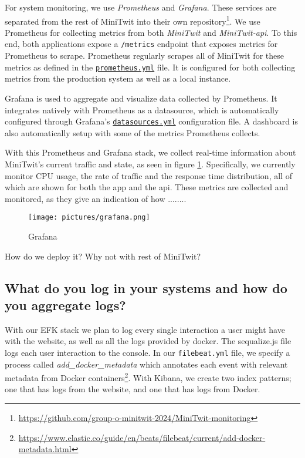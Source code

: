 \documentclass[11pt]{article}
\begin{document}
For system monitoring, we use \textit{Prometheus} and \textit{Grafana}. These services are separated from the rest of MiniTwit into their own repository\footnote{\url{https://github.com/group-o-minitwit-2024/MiniTwit-monitoring}}. We use Prometheus for collecting metrics from both \textit{MiniTwit} and \textit{MiniTwit-api}. To this end, both applications expose a \texttt{/metrics} endpoint that exposes metrics for Prometheus to scrape. Prometheus regularly scrapes all of MiniTwit for these metrics as defined in the \href{https://github.com/group-o-minitwit-2024/MiniTwit-monitoring/blob/main/prometheus/prometheus.yml}{\texttt{prometheus.yml}} file. It is configured for both collecting metrics from the production system as well as a local instance. 

Grafana is used to aggregate and visualize data collected by Prometheus. It integrates natively with Prometheus as a datasource, which is automatically configured through Grafana's \href{https://github.com/group-o-minitwit-2024/MiniTwit-monitoring/blob/main/grafana/provisioning/datasources/datasources.yaml}{\texttt{datasources.yml}} configuration file. A dashboard is also automatically setup with some of the metrics Prometheus collects. 

With this Prometheus and Grafana stack, we collect real-time information about MiniTwit's current traffic and state, as seen in figure \ref{fig:grafana}. Specifically, we currently monitor CPU usage, the rate of traffic and the response time distribution, all of which are shown for both the app and the api. These metrics are collected and monitored, as they give an indication of how ........

\begin{figure}[h]
    \centering
    \texttt{[image: pictures/grafana.png]}
    \caption{Grafana}
    \label{fig:grafana}
\end{figure}

How do we deploy it?
    Why not with rest of MiniTwit?


\subsection{What do you log in your systems and how do you aggregate logs?}
With our EFK stack we plan to log every single interaction a user might have with the website, as well as all the logs provided by docker. The sequalize.js file logs each user interaction to the console. In our \texttt{filebeat.yml} file, we specify a process called \textit{add\_docker\_metadata} which annotates each event with relevant metadata from Docker containers\footnote{\url{https://www.elastic.co/guide/en/beats/filebeat/current/add-docker-metadata.html}}. With Kibana, we create two index patterns; one that has logs from the website, and one that has logs from Docker. 
\end{document}

